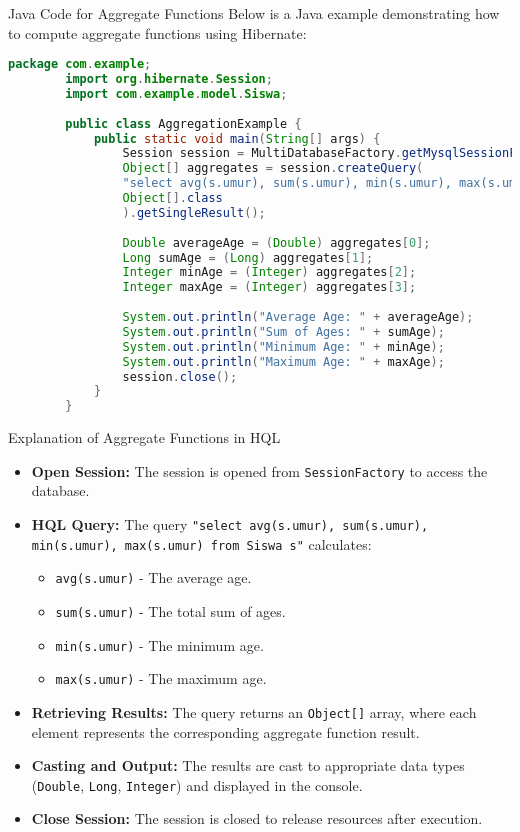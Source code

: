 \documentclass[aspectratio=169, table]{beamer}
\begin{document}
\begin{frame}[fragile]{Java Code for Aggregate Functions}
	\vspace{30pt}
	Below is a Java example demonstrating how to compute aggregate functions using Hibernate:
	
	\begin{lstlisting}[language=Java, style=JavaStyle]
		package com.example;
		import org.hibernate.Session;
		import com.example.model.Siswa;
		
		public class AggregationExample {
			public static void main(String[] args) {
				Session session = MultiDatabaseFactory.getMysqlSessionFactory().openSession();
				Object[] aggregates = session.createQuery(
				"select avg(s.umur), sum(s.umur), min(s.umur), max(s.umur) from Siswa s", 
				Object[].class
				).getSingleResult();
				
				Double averageAge = (Double) aggregates[0];
				Long sumAge = (Long) aggregates[1];
				Integer minAge = (Integer) aggregates[2];
				Integer maxAge = (Integer) aggregates[3];
				
				System.out.println("Average Age: " + averageAge);
				System.out.println("Sum of Ages: " + sumAge);
				System.out.println("Minimum Age: " + minAge);
				System.out.println("Maximum Age: " + maxAge);
				session.close();
			}
		}
	\end{lstlisting}
\end{frame}

\begin{frame}{Explanation of Aggregate Functions in HQL}
	\vspace{20pt}
	\begin{itemize}
		\item \textbf{Open Session:} The session is opened from \texttt{SessionFactory} to access the database.
		\item \textbf{HQL Query:} The query \texttt{"select avg(s.umur), sum(s.umur), min(s.umur), max(s.umur) from Siswa s"} calculates:
		\begin{itemize}
			\item \texttt{avg(s.umur)} - The average age.
			\item \texttt{sum(s.umur)} - The total sum of ages.
			\item \texttt{min(s.umur)} - The minimum age.
			\item \texttt{max(s.umur)} - The maximum age.
		\end{itemize}
		\item \textbf{Retrieving Results:} The query returns an \texttt{Object[]} array, where each element represents the corresponding aggregate function result.
		\item \textbf{Casting and Output:} The results are cast to appropriate data types (\texttt{Double}, \texttt{Long}, \texttt{Integer}) and displayed in the console.
		\item \textbf{Close Session:} The session is closed to release resources after execution.
	\end{itemize}
\end{frame}
\end{document}

